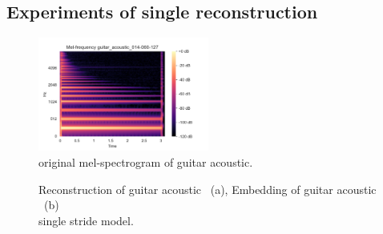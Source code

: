 \subsection{Experiments of single reconstruction}

\begin{figure}[htb!]
    \centering
    \includegraphics[width=0.5\textwidth]{images/results/mel_guitar_acoustic_014-060-127.png}
    \caption{original mel-spectrogram of guitar acoustic.}
    \label{fig:res_2D_mel_guit}
\end{figure}

\begin{figure}[htb!]
    \centering
    \captionsetup{justification=centering}
    \caption{Reconstruction of guitar acoustic ~(a), Embedding of guitar acoustic ~(b)\\single stride model.}
    \label{fig:res_mel_single_str_2D_output_emb}
\end{figure}



